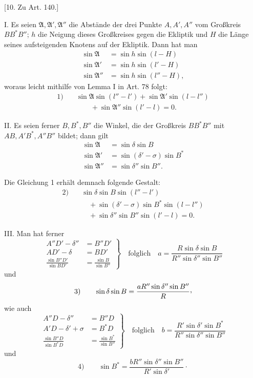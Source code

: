 \begin{center}
[10. Zu Art. 140.]
\end{center}
I. Es seien \(\mathfrak{A},\mathfrak{A}',\mathfrak{A}''\) die Abstände der drei Punkte \(A,A',A''\) vom Großkreis \(BB^*B''\); \(h\) die Neigung dieses Großkreises gegen die Ekliptik und \(H\) die Länge seines aufsteigenden Knotens auf der Ekliptik. Dann hat man
\[
\begin{aligned}
\sin\mathfrak{A}&=\sin h\sin(l-H)\\
\sin\mathfrak{A}'&=\sin h\sin(l'-H)\\
\sin\mathfrak{A}''&=\sin h\sin(l''-H),
\end{aligned}
\]
woraus leicht mithilfe von Lemma I in Art. 78 folgt:
\[
\begin{aligned}
1)\quad &\sin\mathfrak{A}\sin(l''-l')+\sin\mathfrak{A}'\sin(l-l'')\\
&\qquad+\sin\mathfrak{A}''\sin(l'-l)=0.
\end{aligned}
\]

II. Es seien ferner \(B,B^*,B''\) die Winkel, die der Großkreis \(BB^*B''\) mit \(AB,A'B^*,A''B''\) bildet; dann gilt
\[
\begin{aligned}
\sin\mathfrak{A}&=\sin\delta\sin B\\
\sin\mathfrak{A}'&=\sin(\delta'-\sigma)\sin B^*\\
\sin\mathfrak{A}''&=\sin\delta''\sin B''.
\end{aligned}
\]

Die Gleichung 1 erhält demnach folgende Gestalt:
\[
\begin{aligned}
2)\quad &\sin\delta\sin B\sin(l''-l')\\
&\quad+\sin(\delta'-\sigma)\sin B^*\sin(l-l'')\\
&\quad+\sin\delta''\sin B''\sin(l'-l)=0.
\end{aligned}
\]

III. Man hat ferner
\[
\left.\begin{aligned}
A''D'-\delta''&=B''D'\\
AD'-\delta&=BD'\\
\frac{\sin B''D'}{\sin BD'}&=\frac{\sin B}{\sin B''}
\end{aligned}\right\}
\quad\text{folglich}\quad a=\frac{R\sin\delta\sin B}{R''\sin\delta''\sin B''}
\]
und
\[
3)\qquad \sin\delta\sin B=\frac{aR''\sin\delta''\sin B''}{R}\mathpunct{\raisebox{.45ex}{,}}
\]
wie auch
\[
\left.\begin{aligned}
A''D-\delta''&=B''D\\
A'D-\delta'+\sigma&=B^*D\\
\frac{\sin B''D}{\sin B^*D}&=\frac{\sin B^*}{\sin B''}
\end{aligned}\right\}
\quad\text{folglich}\quad b=\frac{R'\sin\delta'\sin B^*}{R''\sin\delta''\sin B''}
\]
und
\[
4)\qquad \sin B^*=\frac{bR''\sin\delta''\sin B''}{R'\sin\delta'}\mathpunct{\cdot}
\]

